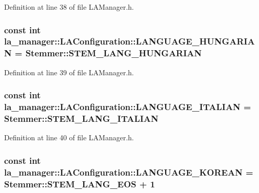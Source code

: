 Definition at line 38 of file LAManager.h.\hypertarget{classla__manager_1_1LAConfiguration_8bfd78dc7c3c226c23ec70b90850c84c}{
\subsubsection[{LANGUAGE\_\-HUNGARIAN}]{\setlength{\rightskip}{0pt plus 5cm}const int {\bf la\_\-manager::LAConfiguration::LANGUAGE\_\-HUNGARIAN} = Stemmer::STEM\_\-LANG\_\-HUNGARIAN}}
\label{classla__manager_1_1LAConfiguration_8bfd78dc7c3c226c23ec70b90850c84c}




Definition at line 39 of file LAManager.h.\hypertarget{classla__manager_1_1LAConfiguration_d1fdc7507060f8bb4aa564968c5ceeed}{
\subsubsection[{LANGUAGE\_\-ITALIAN}]{\setlength{\rightskip}{0pt plus 5cm}const int {\bf la\_\-manager::LAConfiguration::LANGUAGE\_\-ITALIAN} = Stemmer::STEM\_\-LANG\_\-ITALIAN}}
\label{classla__manager_1_1LAConfiguration_d1fdc7507060f8bb4aa564968c5ceeed}




Definition at line 40 of file LAManager.h.\hypertarget{classla__manager_1_1LAConfiguration_e9be58e2f82a87896be78b364ad61f88}{
\subsubsection[{LANGUAGE\_\-KOREAN}]{\setlength{\rightskip}{0pt plus 5cm}const int {\bf la\_\-manager::LAConfiguration::LANGUAGE\_\-KOREAN} = Stemmer::STEM\_\-LANG\_\-EOS + 1}}
\label{classla__manager_1_1LAConfiguration_e9be58e2f82a87896be78b364ad61f88}




